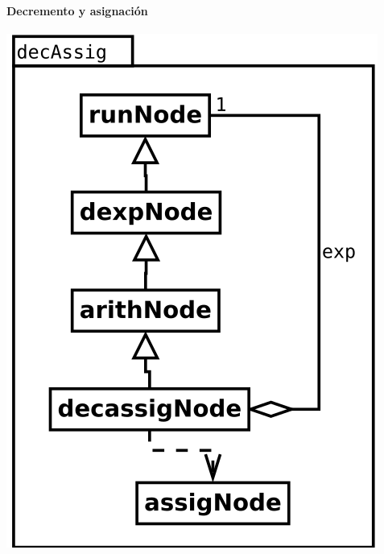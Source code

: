 \paragraph {Decremento y asignación}
\begin{center}
\includegraphics[scale=0.4]{decAssig.png} \\
\end{center}

